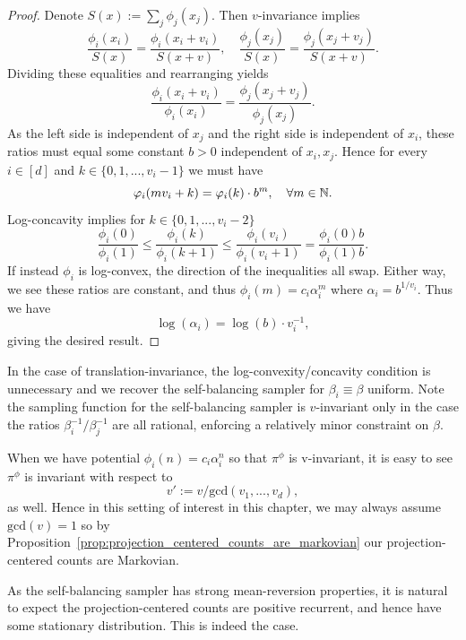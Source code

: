 \begin{proof}
    Denote $S(x) := \sum_j \phi_j(x_j)$.
    Then $v$-invariance implies
    \[\frac{\phi_i(x_i)}{S(x)} = \frac{\phi_i(x_i + v_i)}{S(x + v)}, \quad \frac{\phi_j(x_j)}{S(x)} = \frac{\phi_j(x_j + v_j)}{S(x + v)}.\]
    \noindent Dividing these equalities and rearranging yields
    \[\frac{\phi_i(x_i + v_i)}{\phi_i(x_i )} = \frac{\phi_j(x_j + v_j)}{\phi_j(x_j)}.\]
    \noindent As the left side is independent of $x_j$ and the right side is independent of $x_i$, these ratios must equal some constant $b > 0$ independent of $x_i, x_j$.
    Hence for every $i \in [d]$ and $k \in \{0, 1, ..., v_i-1\}$ we must have
    \[\varphi_i(m v_i + k) = \varphi_i(k) \cdot b^m, \quad \forall m \in \mathbb{N}.\]
    \noindent Log-concavity implies for $k \in \{0, 1, ..., v_{i} - 2\}$
    \[\frac{\phi_i(0)}{\phi_i(1)} \leq \frac{\phi_i(k)}{\phi_i(k+1)} \leq \frac{\phi_i(v_i)}{\phi_i(v_i+1)} = \frac{\phi_i(0)b}{\phi_i(1)b}.\]
    \noindent If instead $\phi_i$ is log-convex, the direction of the inequalities all swap. Either way, we see these ratios are constant, and thus $\phi_i(m) = c_i\alpha_i^m$ where $\alpha_i = b^{1/v_i}$.
    Thus we have
    \[\log(\alpha_i) = \log(b) \cdot v_i^{-1},\]
    \noindent giving the desired result.
\end{proof}

\noindent In the case of translation-invariance, the log-convexity/concavity condition is unnecessary and 
we recover the self-balancing sampler for $\beta_i \equiv \beta$ uniform. Note the sampling function 
for the self-balancing sampler is $v$-invariant only in the case the ratios $\beta_i^{-1}/\beta_j^{-1}$ are 
all rational, enforcing a relatively minor constraint on $\beta$.

    When we have potential $\phi_i(n) = c_i \alpha_i^n$ so that $\pi^\phi$ is v-invariant, it is easy to see $\pi^\phi$ is invariant with respect to
        \[v' := v / \mathrm{gcd}(v_1,..., v_d),\]
    \noindent as well. Hence in this setting of interest in this chapter, we may always assume $\mathrm{gcd}(v) = 1$ so by Proposition~\ref{prop:projection_centered_counts_are_markovian} our projection-centered counts are Markovian.

As the self-balancing sampler has strong mean-reversion
properties, it is natural to expect the projection-centered counts are positive recurrent, and hence
have some stationary distribution. This is indeed the case.

